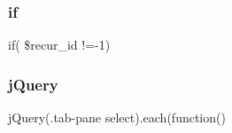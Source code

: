 \subsubsection{if}
{\footnotesize\ttfamily if( \$recur\+\_\+id !=-\/1)}

\mbox{\label{edittmpl_8php_a31fe003e8a48233f1b52d81f3e07629e}} 
\subsubsection{j\+Query}
{\footnotesize\ttfamily j\+Query(\textquotesingle{}.tab-\/pane select\textquotesingle{}).each(function()}

